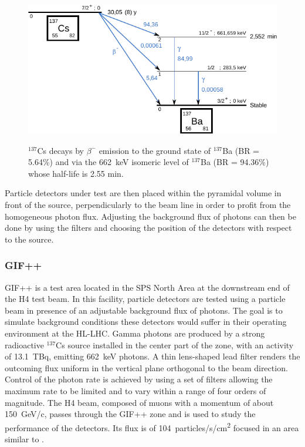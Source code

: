 				\begin{figure}[!h]
				\begin{center}
					\includegraphics[width = \plotwidth]{fig/Cs137.pdf}\\
					\caption{\label{fig:CsSource} $^{137}$Cs decays by $\beta^-$ emission to the ground state of $^{137}$Ba (BR = 5.64\%) and via the \SI{662}{\keV} isomeric level of $^{137}$Ba (BR = 94.36\%) whose half-life is 2.55 min.}
				\end{center}
			\end{figure}
			
			Particle detectors under test are then placed within the pyramidal volume in front of the source, perpendicularly to the beam line in order to profit from the homogeneous photon flux. Adjusting the background flux of photons can then be done by using the filters and choosing the position of the detectors with respect to the source.
			
		
		\subsubsection{GIF++}
		\label{sssec:GIF++}
		
			GIF++ is a test area located in the SPS North Area at the downstream end of the H4 test beam. In this facility, particle detectors are tested using a particle beam in presence of an adjustable background flux of photons. The goal is to simulate background conditions these detectors would suffer in their operating environment at the HL-LHC. Gamma photons are produced by a strong radioactive $^{137}$Cs source installed in the center part of the zone, with an activity of \SI{13.1}{TBq}, emitting \SI{662}{\keV} photons. A thin lens-shaped lead filter renders the outcoming flux uniform in the vertical plane orthogonal to the beam direction. Control of the photon rate is achieved by using a set of filters allowing the maximum rate to be limited and to vary within a range of four orders of magnitude. The H4 beam, composed of muons with a momentum of about \SI{150}{GeV/c}, passes through the GIF++ zone and is used to study the performance of the detectors. Its flux is of \SI{104}{particles/s/\square\cm} focused in an area similar to .
		
